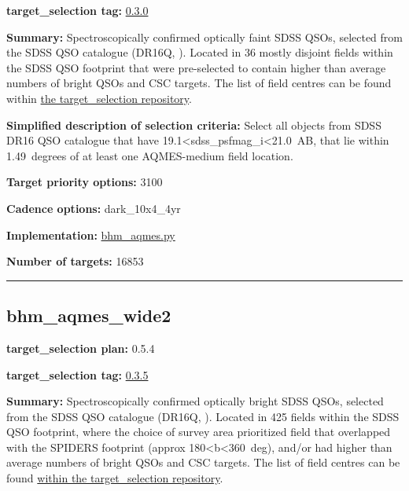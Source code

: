 \noindent\textbf{target\_selection tag:}
\href{https://github.com/sdss/target_selection/tree/0.3.0/}{0.3.0}

\noindent\textbf{Summary:} Spectroscopically confirmed optically faint SDSS QSOs,
selected from the SDSS QSO catalogue (DR16Q,
\citealt{Lyke2020}). Located in 36 mostly disjoint fields within the SDSS QSO
footprint that were pre-selected to contain higher than average numbers
of bright QSOs and CSC targets. The list of field centres can be found
within
\href{https://github.com/sdss/target_selection/blob/0.3.0/python/target_selection/masks/candidate_target_fields_bhm_aqmes_med_v0.3.1.fits}{the
target\_selection repository}.

\noindent\textbf{Simplified description of selection criteria:} Select all
objects from SDSS DR16 QSO catalogue that have
19.1\textless sdss\_psfmag\_i\textless21.0~AB, that lie within
1.49~degrees of at least one AQMES-medium field location.


\noindent\textbf{Target priority options:} 3100

\noindent\textbf{Cadence options:} dark\_10x4\_4yr

\noindent\textbf{Implementation:}
\href{https://github.com/sdss/target_selection/blob/0.3.0/python/target_selection/cartons/bhm_aqmes.py}{bhm\_aqmes.py}

\noindent\textbf{Number of targets:} 16853

\begin{center}\rule{0.5\linewidth}{0.5pt}\end{center}

\hypertarget{bhm_aqmes_wide2_plan0.5.4}{%
\subsection{bhm\_aqmes\_wide2}\label{bhm_aqmes_wide2_plan0.5.4}}

\noindent\textbf{target\_selection plan:} 0.5.4

\noindent\textbf{target\_selection tag:}
\href{https://github.com/sdss/target_selection/tree/0.3.5/}{0.3.5}

\noindent\textbf{Summary:} Spectroscopically confirmed optically bright SDSS
QSOs, selected from the SDSS QSO catalogue (DR16Q,
\citealt{Lyke2020}). Located in 425 fields within the SDSS QSO footprint,
where the choice of survey area prioritized field that overlapped with
the SPIDERS footprint (approx 180\textless b\textless360~deg), and/or
had higher than average numbers of bright QSOs and CSC targets. The list
of field centres can be found
\href{https://github.com/sdss/target_selection/blob/0.3.0/python/target_selection/masks/candidate_target_fields_bhm_aqmes_wide_v0.3.1.fits}{within
the target\_selection repository}.

